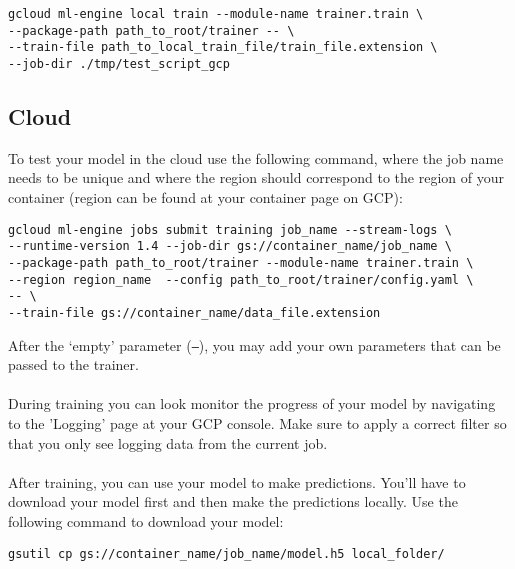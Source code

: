 \documentclass{article}
\begin{document}
\begin{verbatim}
gcloud ml-engine local train --module-name trainer.train \ 
--package-path path_to_root/trainer -- \
--train-file path_to_local_train_file/train_file.extension \
--job-dir ./tmp/test_script_gcp
\end{verbatim}


\subsection{Cloud}
To test your model in the cloud use the following command, where the job name needs to be unique and where the region should correspond to the region of your container (region can be found at your container page on GCP):
\begin{verbatim}
gcloud ml-engine jobs submit training job_name --stream-logs \
--runtime-version 1.4 --job-dir gs://container_name/job_name \
--package-path path_to_root/trainer --module-name trainer.train \
--region region_name  --config path_to_root/trainer/config.yaml \
-- \
--train-file gs://container_name/data_file.extension
\end{verbatim}
After the `empty' parameter (\texttt{--}), you may add your own parameters that can be passed to the trainer. \\
\\
During training you can look monitor the progress of your model by navigating to the 'Logging' page at your GCP console. Make sure to apply a correct filter so that you only see logging data from the current job.
\\
\\
After training, you can use your model to make predictions. You'll have to download your model first and then make the predictions locally. Use the following command to download your model:
\begin{verbatim}
gsutil cp gs://container_name/job_name/model.h5 local_folder/
\end{verbatim}
\end{document}

